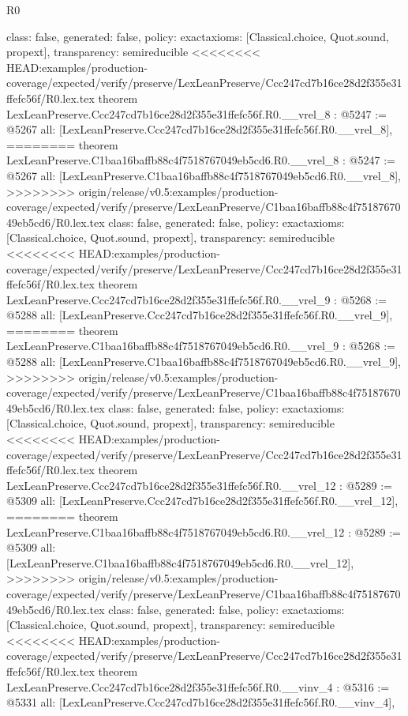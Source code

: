 \begin{lexlean}{R0}
\begin{coremodule}
{{{{{{{{{{{{{{{{{{{{{{{{{{{{{{{{{{{{{{{{{{{{{{{{{{{{{{{{{{{{{{{{{{{{{{{  class: false,
  generated: false,
  policy: exact{axioms: [Classical.choice, Quot.sound, propext]},
  transparency: semireducible
}
<<<<<<<< HEAD:examples/production-coverage/expected/verify/preserve/LexLeanPreserve/Ccc247cd7b16ce28d2f355e31ffefc56f/R0.lex.tex
theorem LexLeanPreserve.Ccc247cd7b16ce28d2f355e31ffefc56f.R0.__vrel_8 : @5247 := @5267 {
  all: [LexLeanPreserve.Ccc247cd7b16ce28d2f355e31ffefc56f.R0.__vrel_8],
========
theorem LexLeanPreserve.C1baa16baffb88c4f7518767049eb5cd6.R0.__vrel_8 : @5247 := @5267 {
  all: [LexLeanPreserve.C1baa16baffb88c4f7518767049eb5cd6.R0.__vrel_8],
>>>>>>>> origin/release/v0.5:examples/production-coverage/expected/verify/preserve/LexLeanPreserve/C1baa16baffb88c4f7518767049eb5cd6/R0.lex.tex
  class: false,
  generated: false,
  policy: exact{axioms: [Classical.choice, Quot.sound, propext]},
  transparency: semireducible
}
<<<<<<<< HEAD:examples/production-coverage/expected/verify/preserve/LexLeanPreserve/Ccc247cd7b16ce28d2f355e31ffefc56f/R0.lex.tex
theorem LexLeanPreserve.Ccc247cd7b16ce28d2f355e31ffefc56f.R0.__vrel_9 : @5268 := @5288 {
  all: [LexLeanPreserve.Ccc247cd7b16ce28d2f355e31ffefc56f.R0.__vrel_9],
========
theorem LexLeanPreserve.C1baa16baffb88c4f7518767049eb5cd6.R0.__vrel_9 : @5268 := @5288 {
  all: [LexLeanPreserve.C1baa16baffb88c4f7518767049eb5cd6.R0.__vrel_9],
>>>>>>>> origin/release/v0.5:examples/production-coverage/expected/verify/preserve/LexLeanPreserve/C1baa16baffb88c4f7518767049eb5cd6/R0.lex.tex
  class: false,
  generated: false,
  policy: exact{axioms: [Classical.choice, Quot.sound, propext]},
  transparency: semireducible
}
<<<<<<<< HEAD:examples/production-coverage/expected/verify/preserve/LexLeanPreserve/Ccc247cd7b16ce28d2f355e31ffefc56f/R0.lex.tex
theorem LexLeanPreserve.Ccc247cd7b16ce28d2f355e31ffefc56f.R0.__vrel_12 : @5289 := @5309 {
  all: [LexLeanPreserve.Ccc247cd7b16ce28d2f355e31ffefc56f.R0.__vrel_12],
========
theorem LexLeanPreserve.C1baa16baffb88c4f7518767049eb5cd6.R0.__vrel_12 : @5289 := @5309 {
  all: [LexLeanPreserve.C1baa16baffb88c4f7518767049eb5cd6.R0.__vrel_12],
>>>>>>>> origin/release/v0.5:examples/production-coverage/expected/verify/preserve/LexLeanPreserve/C1baa16baffb88c4f7518767049eb5cd6/R0.lex.tex
  class: false,
  generated: false,
  policy: exact{axioms: [Classical.choice, Quot.sound, propext]},
  transparency: semireducible
}
<<<<<<<< HEAD:examples/production-coverage/expected/verify/preserve/LexLeanPreserve/Ccc247cd7b16ce28d2f355e31ffefc56f/R0.lex.tex
theorem LexLeanPreserve.Ccc247cd7b16ce28d2f355e31ffefc56f.R0.__vinv_4 : @5316 := @5331 {
  all: [LexLeanPreserve.Ccc247cd7b16ce28d2f355e31ffefc56f.R0.__vinv_4],
}}}}}}}}}}}}}}}}}}}}}}}}}}}}}}}}}}}}}}}}}}}}}}}}}}}}}}}}}}}}}}}}}}}}}}}}}}
\end{coremodule}
\end{lexlean}
